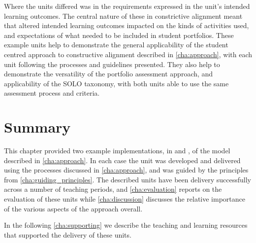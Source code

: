 Where the units differed was in the requirements expressed in the unit's intended learning outcomes. The central nature of these in constrictive alignment meant that altered intended learning outcomes impacted on the kinds of activities used, and expectations of what needed to be included in student portfolios. These example units help to demonstrate the general applicability of the student centred approach to constructive alignment described in \cref{cha:approach}, with each unit following the processes and guidelines presented. They also help to demonstrate the versatility of the portfolio assessment approach, and applicability of the SOLO taxonomy, with both units able to use the same assessment process and criteria.



\section{Summary} %
\label{sec:ca_intro_summary}

This chapter provided two example implementations, in  and , of the model described in \cref{cha:approach}. In each case the unit was developed and delivered using the processes discussed in \cref{cha:approach}, and was guided by the principles from \cref{cha:guiding_principles}. The described units have been delivery successfully across a number of teaching periods, and \cref{cha:evaluation} reports on the evaluation of these units while \cref{cha:discussion} discusses the relative importance of the various aspects of the approach overall.

In the following \cref{cha:supporting} we describe the teaching and learning resources that supported the delivery of these units.



